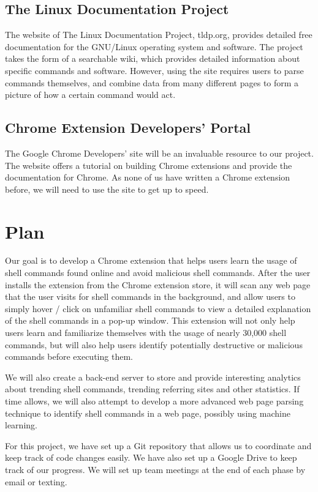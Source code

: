 \documentclass[11pt]{article}
\begin{document}
\subsection{The Linux Documentation Project}

The website of The Linux Documentation Project, tldp.org, provides detailed free documentation for the GNU/Linux operating system and software. The project takes the form of a searchable wiki, which provides detailed information about specific commands and software. However, using the site requires users to parse commands themselves, and combine data from many different pages to form a picture of how a certain command would act.

\subsection{Chrome Extension Developers' Portal}

The Google Chrome Developers' site will be an invaluable resource to our project. The website offers a tutorial on building Chrome extensions and provide the documentation for Chrome. As none of us have written a Chrome extension before, we will need to use the site to get up to speed.

\section{Plan}

Our goal is to develop a Chrome extension that helps users learn the usage of shell commands found online and avoid malicious shell commands. After the user installs the extension from the Chrome extension store, it will scan any web page that the user visits for shell commands in the background, and allow users to simply hover / click on unfamiliar shell commands to view a detailed explanation of the shell commands in a pop-up window. This extension will not only help users learn and familiarize themselves with the usage of nearly 30,000 shell commands, but will also help users identify potentially destructive or malicious commands before executing them. 

We will also create a back-end server to store and provide interesting analytics about trending shell commands, trending referring sites and other statistics. If time allows, we will also attempt to develop a more advanced web page parsing technique to identify shell commands in a web page, possibly using machine learning.

For this project, we have set up a Git repository that allows us to coordinate and keep track of code changes easily. We have also set up a Google Drive to keep track of our progress. We will set up team meetings at the end of each phase by email or texting.
\end{document}
